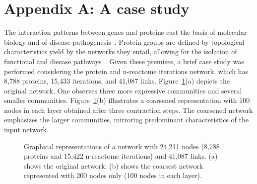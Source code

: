 \documentclass[runningheads]{llncs}
\begin{document}
\appendix

\newpage



\section*{Appendix A: A case study}
The interaction patterns between genes and proteins cast the basis of molecular biology and of disease pathogenesis~\cite{mlCa,netD}.
Protein groups are defined by topological characteristics yield by the networks they entail,
allowing for the isolation of functional and disease pathways~\cite{bara,shara}.
Given these premises,
a brief case study was performed considering the protein and
n-reactome iterations network,
which has 8,788 proteins, 15,433 iterations, and 41,087 links.
Figure~\ref{aml0}(a) depicts the original network. One observes three more expressive communities and several smaller communities.
Figure~\ref{aml0}(b) illustrates a coarsened representation with 100 nodes in each layer obtained after three contraction steps.
The coarsened network emphasizes the larger communities,
mirroring predominant characteristics of the input network.


\begin{figure}[!h]\centering
    \qquad
    \caption{Graphical representations of a network with 24,211 nodes (8,788 proteins and 15,422 n-reactome iterations) and 41,087 links.
    (a) shows the original network; (b) shows the coarsest network represented with 200 nodes only (100 nodes in each layer).
    }%
    \label{aml0}%
\end{figure}
\end{document}
